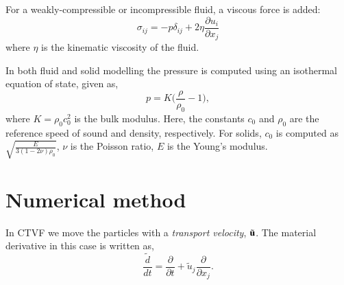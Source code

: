 For a weakly-compressible or incompressible fluid, a viscous force is added:
\begin{equation}
  \label{eq:fluid-stress-decomposition}
  \sigma_{ij} = - p \delta_{ij} + 2 \eta \frac{\partial u_i}{\partial x_j}
\end{equation}
where $\eta$ is the kinematic viscosity of the fluid.

In both fluid and solid modelling the pressure is computed using an
isothermal equation of state, given as,
\begin{equation}
  \label{eq:pressure-equation}
  p = K \bigg(\frac{\rho}{\rho_{0}} - 1 \bigg),
\end{equation}
where $K = \rho_{0} c_0^2$ is the bulk modulus. Here, the constants $c_0$ and
$\rho_0$ are the reference speed of sound and density, respectively. For solids,
$c_0$ is computed as $\sqrt{\frac{E}{3 (1 - 2 \nu)\rho_{0}}}$, $\nu$ is the
Poisson ratio, $E$ is the Young's modulus.

\section{Numerical method}
In CTVF we move the particles with a \emph{transport velocity},
$\tilde{\mathbf{u}}$. The material derivative in this case is written as,
\begin{equation}
  \label{eq:modified-material-derivative}
  \frac{\tilde{d} }{d t} = \frac{\partial }{\partial t} +
  \tilde{u}_j \frac{\partial }{\partial x_j}.
\end{equation}

